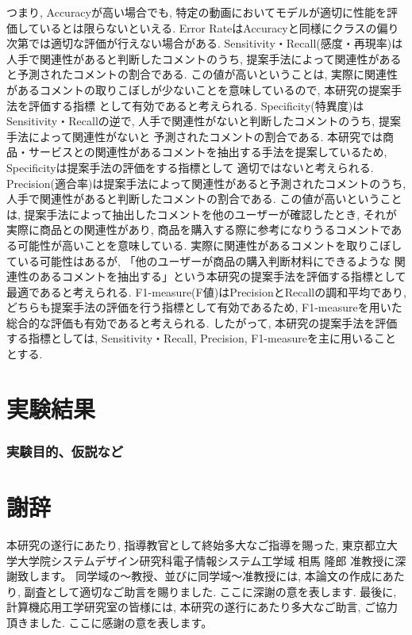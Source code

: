 \documentclass{ltjarticle}
\begin{document}
\newpage
\noindent
つまり, Accuracyが高い場合でも, 特定の動画においてモデルが適切に性能を評価しているとは限らないといえる. 
Error RateはAccuracyと同様にクラスの偏り次第では適切な評価が行えない場合がある. 
Sensitivity・Recall(感度・再現率)は人手で関連性があると判断したコメントのうち, 提案手法によって関連性があると予測されたコメントの割合である. 
この値が高いということは, 実際に関連性があるコメントの取りこぼしが少ないことを意味しているので, 本研究の提案手法を評価する指標
として有効であると考えられる. 
Specificity(特異度)はSensitivity・Recallの逆で, 人手で関連性がないと判断したコメントのうち, 提案手法によって関連性がないと
予測されたコメントの割合である. 
本研究では商品・サービスとの関連性があるコメントを抽出する手法を提案しているため, Specificityは提案手法の評価をする指標として
適切ではないと考えられる. 
Precision(適合率)は提案手法によって関連性があると予測されたコメントのうち, 人手で関連性があると判断したコメントの割合である. 
この値が高いということは, 提案手法によって抽出したコメントを他のユーザーが確認したとき, それが実際に商品との関連性があり, 
商品を購入する際に参考になりうるコメントである可能性が高いことを意味している. 
実際に関連性があるコメントを取りこぼしている可能性はあるが, 「他のユーザーが商品の購入判断材料にできるような
関連性のあるコメントを抽出する」という本研究の提案手法を評価する指標として最適であると考えられる. 
F1-measure(F値)はPrecisionとRecallの調和平均であり, どちらも提案手法の評価を行う指標として有効であるため, 
F1-measureを用いた総合的な評価も有効であると考えられる. したがって, 本研究の提案手法を評価する指標としては, Sensitivity・Recall, 
Precision, F1-measureを主に用いることとする. 

\newpage
\part{実験結果}
\section
{実験目的、仮説など}












\newpage
\part*{謝辞}
本研究の遂行にあたり, 指導教官として終始多大なご指導を賜った, 
東京都立大学大学院システムデザイン研究科電子情報システム工学域 相馬 隆郎 准教授に深謝致します。
同学域の～教授、並びに同学域～准教授には, 本論文の作成にあたり, 副査として適切なご助言を賜りました. ここに深謝の意を表します. 
最後に, 計算機応用工学研究室の皆様には, 本研究の遂行にあたり多大なご助言, ご協力頂きました. ここに感謝の意を表します。
\end{document}
